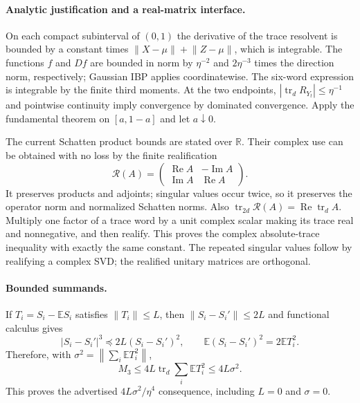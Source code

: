 \documentclass[11pt,a4paper]{article}
\newcommand{\R}{\mathbb R}
\newcommand{\norm}[1]{\left\lVert#1\right\rVert}
\DeclareMathOperator{\tr}{tr}
\begin{document}
\paragraph{Analytic justification and a real-matrix interface.}
On each compact subinterval of $(0,1)$ the derivative of the trace
resolvent is bounded by a constant times $\norm{X-\mu}+\norm{Z-\mu}$,
which is integrable.  The functions $f$ and $Df$ are bounded in norm by
$\eta^{-2}$ and $2\eta^{-3}$ times the direction norm, respectively;
Gaussian IBP applies coordinatewise.  The six-word expression is
integrable by the finite third moments.  At the two endpoints,
$|\tr_d R_{Y_t}|\le\eta^{-1}$ and pointwise continuity imply convergence
by dominated convergence.  Apply the fundamental theorem on
$[a,1-a]$ and let $a\downarrow0$.

The current Schatten product bounds are stated over $\R$.  Their complex
use can be obtained with no loss by the finite realification
\[
 \mathcal R(A)=\begin{pmatrix}\operatorname{Re}A&-\operatorname{Im}A\\
                         \operatorname{Im}A&\operatorname{Re}A\end{pmatrix}.
\]
It preserves products and adjoints; singular values occur twice, so it
preserves the operator norm and normalized Schatten norms.  Also
$\tr_{2d}\mathcal R(A)=\operatorname{Re}\tr_d A$.
Multiply one factor of a trace word by a unit complex scalar making its
trace real and nonnegative, and then realify.  This proves the complex
absolute-trace inequality with exactly the same constant.  The repeated
singular values follow by realifying a complex SVD; the realified unitary
matrices are orthogonal.

\paragraph{Bounded summands.}
If $T_i=S_i-\mathbb ES_i$ satisfies $\norm{T_i}\le L$, then
$\norm{S_i-S_i'}\le2L$ and functional calculus gives
\[
 |S_i-S_i'|^3\preceq2L(S_i-S_i')^2,
 \qquad \mathbb E(S_i-S_i')^2=2\mathbb ET_i^2.
\]
Therefore, with $\sigma^2=\norm{\sum_i\mathbb ET_i^2}$,
\[
 M_3\le4L\tr_d\sum_i\mathbb ET_i^2\le4L\sigma^2.
\]
This proves the advertised $4L\sigma^2/\eta^4$ consequence, including
$L=0$ and $\sigma=0$.
\end{document}
